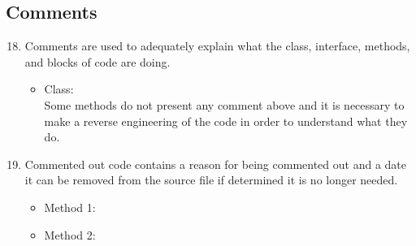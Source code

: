 \subsection{Comments}
\begin{enumerate}
\setcounter{enumi}{17}
	\item  Comments are used to adequately explain what the class, interface, methods, and blocks
	of code are doing.
		\begin{itemize}
		 	\item Class: \xmark\\
		 	Some methods do not present any comment above and it is necessary to make a reverse engineering of the code in order to understand what they do.
		\end{itemize}
	\item Commented out code contains a reason for being commented out and a date it can be removed from the source file if determined it is no longer needed.
		\begin{itemize}
		 	\item Method 1: \cmark
	 		\item Method 2: \cmark
		\end{itemize}
\end{enumerate}